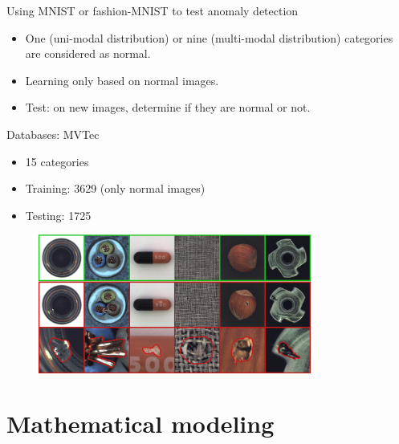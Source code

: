 \documentclass[xcolor=pdftex,dvipsnames,table,mathserif]{beamer}
\begin{document}
\begin{frame}{Using MNIST or fashion-MNIST to test anomaly detection}

\begin{itemize}
\item One (uni-modal distribution) or nine (multi-modal distribution) categories are considered as normal.
\item Learning only based on normal images.
\item Test: on new images, determine if they are normal or not.
\end{itemize}

\end{frame}



\begin{frame}{Databases: MVTec~\tiny{\cite{bergmann_mvtec_2019}}}

\begin{itemize}
\item 15 categories
\item Training: 3629 (only normal images)
\item Testing: 1725
\end{itemize}

\begin{figure}[ht]
  \centering
  \includegraphics[width=0.8\textwidth]{mvtec}
\end{figure}


\end{frame}



\section{Mathematical modeling}
\end{document}
